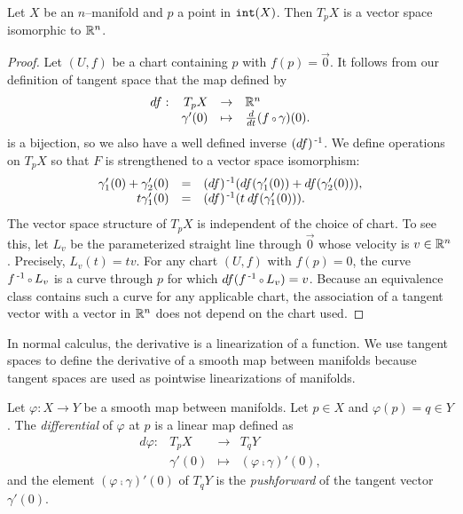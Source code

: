 \begin{prop}
	\label{prop:tangentspacevectorspace}
	Let $X$ be an $n$--manifold and $p$ a point in $\mathtt{int}(X)$.
	Then $T_p X$ is a vector space isomorphic to $\mathbb{R}^n$.
\end{prop}

\begin{proof}
	Let $(U,f)$ be a chart containing $p$ with $f(p)=\vec{0}$.
	It follows from our definition of tangent space that the map defined by
	\[
		\begin{array}{crcl}
			df : & T_p X & \to & \RRN \\
			& \gamma'(0) & \mapsto & \Ddt(f\comp \gamma)(0) .
		\end{array}
	\]
	is a bijection, so we also have a well defined inverse $(df)^{\,\text{-}1}$.
	We define operations on $T_p X$ so that $F$ is strengthened to a vector space isomorphism:
	\[
		\begin{array}{rcl}
			\gamma_1'(0)+\gamma_2'(0) & = & (df)^{\,\text{-}1}(df(\gamma_1'(0))+df(\gamma_2'(0))), \\
			t\gamma_1'(0) & = & (df)^{\,\text{-}1}(t\:df(\gamma_1'(0))).
		\end{array}
	\]
	The vector space structure of $T_p X$ is independent of the choice of chart.
	To see this, let $L_v$ be the parameterized straight line through $\vec{0}$ whose velocity is $v\in\mathbb{R}^n$.
	Precisely, $L_v(t)=tv.$
	For any chart $(U,f)$ with $f(p)=0$, the curve $f\inv\comp L_v$ is a curve through $p$ for which $df(f\inv\comp L_v)=v$.
	Because an equivalence class contains such a curve for any applicable chart, the association of a tangent vector with a vector in $\mathbb{R}^n$ does not depend on the chart used.
\end{proof}

In normal calculus, the derivative is a linearization of a function.
We use tangent spaces to define the derivative of a smooth map between manifolds because tangent spaces are used as pointwise linearizations of manifolds.

\begin{defn}
	Let $\varphi:X\to Y$ be a smooth map between manifolds.
	Let $p\in X$ and $\varphi(p)=q\in Y$.
	The \emph{differential} of $\varphi$ at $p$ is a linear map defined as
	\[
		\begin{array}{crcl}
			d\varphi: & T_p X & \to & T_q Y\\
					  & \gamma'(0) & \mapsto & (\varphi\comp\gamma)'(0),
		\end{array}
	\]
	and the element $(\varphi\comp\gamma)'(0)$ of $T_q Y$ is the \emph{pushforward} of the tangent vector $\gamma'(0)$.
\end{defn}

